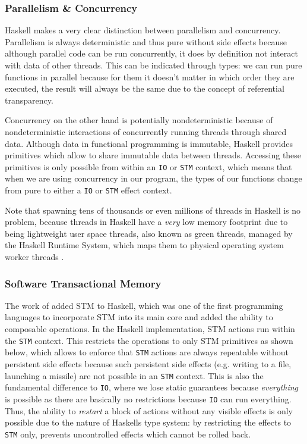 \subsubsection{Parallelism \& Concurrency}
Haskell makes a very clear distinction between parallelism and concurrency. Parallelism is always deterministic and thus pure without side effects because although parallel code can be run concurrently, it does by definition not interact with data of other threads. This can be indicated through types: we can run pure functions in parallel because for them it doesn't matter in which order they are executed, the result will always be the same due to the concept of referential transparency.

Concurrency on the other hand is potentially nondeterministic because of nondeterministic interactions of concurrently running threads through shared data. Although data in functional programming is immutable, Haskell provides primitives which allow to share immutable data between threads. Accessing these primitives is only possible from within an \texttt{IO} or \texttt{STM} context, which means that when we are using concurrency in our program, the types of our functions change from pure to either a \texttt{IO} or \texttt{STM} effect context.

Note that spawning tens of thousands or even millions of threads in Haskell is no problem, because threads in Haskell have a \textit{very} low memory footprint due to being lightweight user space threads, also known as green threads, managed by the Haskell Runtime System, which maps them to physical operating system worker threads \cite{marlow_runtime_2009}.

\subsubsection{Software Transactional Memory}
\label{sub:stm}
The work of \cite{harris_composable_2005, harris_transactional_2006} added STM to Haskell, which was one of the first programming languages to incorporate STM into its main core and added the ability to composable operations. %
In the Haskell implementation, STM actions run within the \texttt{STM} context. This restricts the operations to only STM primitives as shown below, which allows to enforce that \texttt{STM} actions are always repeatable without persistent side effects because such persistent side effects (e.g. writing to a file, launching a missile) are not possible in an \texttt{STM} context. This is also the fundamental difference to \texttt{IO}, where we lose static guarantees because \textit{everything} is possible as there are basically no restrictions because \texttt{IO} can run everything. Thus, the ability to \textit{restart} a block of actions without any visible effects is only possible due to the nature of Haskells type system: by restricting the effects to \texttt{STM} only, prevents uncontrolled effects which cannot be rolled back.

